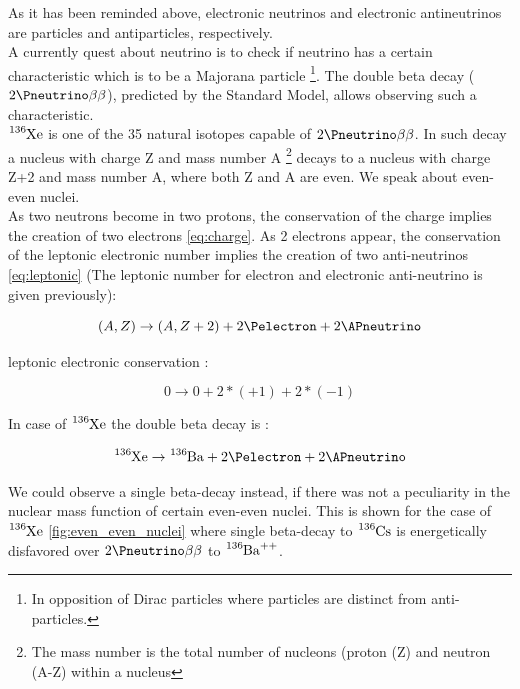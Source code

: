 \documentclass[a4paper, 11pt]{report}%
\begin{document}
  As it has been reminded above, electronic neutrinos and electronic antineutrinos are particles and antiparticles, respectively. \\
  A currently quest about neutrino is to check if neutrino has a certain characteristic which is to be a Majorana particle 
  \footnote{In opposition of Dirac particles where particles are distinct from anti-particles.}.
  The double beta decay (\(2\Pneutrino\beta\beta\)), predicted by the Standard Model, allows observing such a characteristic.
  \\
    
  $\ce{^{136}Xe}$ is one of the 35 natural isotopes capable of \(2\Pneutrino\beta\beta\).
  In such decay a nucleus with charge Z and mass number A \footnote{The mass number is the total number of nucleons (proton (Z) and 
  neutron (A-Z) within a nucleus} decays to a nucleus with charge Z+2 and mass number A, where both Z and A are even. We speak 
  about even-even nuclei.\\
  As two neutrons become in two protons, the conservation of the charge implies the creation of two electrons \ref{eq:charge}. As 2 electrons 
  appear, the conservation of the leptonic electronic number implies the creation of two anti-neutrinos \ref{eq:leptonic} (The leptonic
  number for electron and electronic anti-neutrino is given previously):
  
  \begin{equation} \label{eq:charge}
    (A,Z) \rightarrow (A,Z+2) + 2\Pelectron + 2\APneutrino
  \end{equation}
  
  leptonic electronic conservation :
  
  \begin{equation} \label{eq:leptonic} 
    0 \rightarrow 0 + 2*(+1) + 2*(-1)
  \end{equation}
  
  In case of $\ce{^{136}Xe}$ the double beta decay is : 
 
  \begin{equation}\label{eq:Xe_decay}
    \ce{^{136}Xe} \rightarrow \ce{^{136}Ba} + 2\Pelectron + 2\APneutrino %
  \end{equation}
 
  We could observe a single beta-decay instead, if there was not a peculiarity in the nuclear mass function of certain
  even-even nuclei. This is shown for the case of $\ce{^{136}Xe}$ \ref{fig:even_even_nuclei} where single beta-decay to $\ce{^{136}Cs}$
  is energetically disfavored over \(2\Pneutrino\beta\beta\) to $\ce{^{136}Ba^{++}}$.
 
\end{document}
